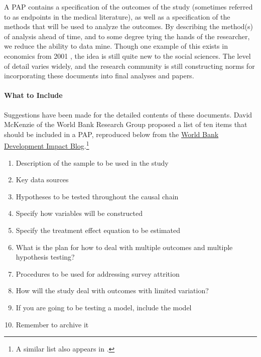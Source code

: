 \documentclass[12pt] {article}
\begin{document}
A PAP contains a specification of the outcomes of the study (sometimes referred to as endpoints in the medical literature), as well as a specification of the methods that will be used to analyze the outcomes. By describing the
method(s) of analysis ahead of time, and to some degree tying the hands
of the researcher, we reduce the ability to data mine. Though one
example of this exists in economics from 2001 \citep{neumark_employment_2001}, the idea
is still quite new to the social sciences. The level of detail varies
widely, and the research community is still constructing norms for
incorporating these documents into final analyses and papers.

\paragraph{What to Include}
Suggestions have been made for the detailed contents of these documents. David McKenzie of the World Bank Research Group proposed a list of ten items that should be included in a PAP, reproduced below from the \href{http://blogs.worldbank.org/impactevaluations/a-pre-analysis-plan-checklist}{World Bank Development Impact Blog}.\footnote{A similar list also appears in \cite{glennerster_running_2013} .}

\begin{enumerate}
\item
  Description of the sample to be used in the study
\item
  Key data sources
\item
  Hypotheses to be tested throughout the causal chain
\item
  Specify how variables will be constructed
\item
  Specify the treatment effect equation to be estimated
\item
  What is the plan for how to deal with multiple outcomes and multiple
  hypothesis testing?
\item
  Procedures to be used for addressing survey attrition
\item
  How will the study deal with outcomes with limited variation?
\item
  If you are going to be testing a model, include the model
\item
  Remember to archive it
\end{enumerate}
\end{document}
